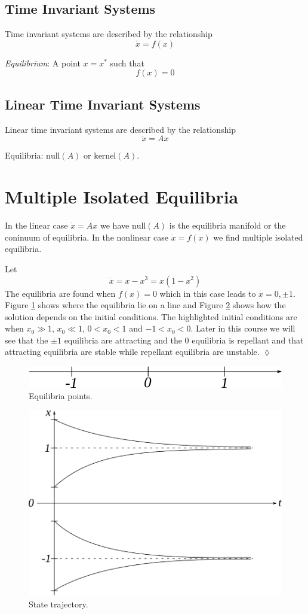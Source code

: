 \subsection{Time Invariant Systems}
Time invariant systems are described by the relationship
$$\dot{x}=f(x)$$
\begin{definition}
\textit{Equilibrium}: A point $x=x^\ast$ such that
$$f(x) = 0$$
\end{definition}

\subsection{Linear Time Invariant Systems}
Linear time invariant systems are described by the relationship
$$\dot{x}=Ax$$
\begin{definition}
Equilibria: $\text{null}(A)$ or $\text{kernel}(A)$.
\end{definition}

\section{Multiple Isolated Equilibria}
In the linear case $\dot{x}=Ax$ we have $\text{null}(A)$ is the equilibria manifold or the coninuum of equilibria. In the nonlinear case $\dot{x}=f(x)$ we find multiple isolated equilibria.
\begin{example}
Let
$$\dot{x} = x-x^3 = x(1-x^2)$$
The equilibria are found when $f(x)=0$ which in this case leads to $x=0,\pm1$. Figure \ref{fig:01roots} shows where the equilibria lie on a line and Figure \ref{fig:01traj} shows how the solution depends on the initial conditions. The highlighted initial conditions are when $x_0\gg1$, $x_0\ll1$, $0<x_0<1$ and $-1<x_0<0$. Later in this course we will see that the $\pm1$ equilibria are attracting and the $0$ equilibria is repellant and that attracting equilibria are stable while repellant equilibria are unstable.
$\lozenge$
\end{example}

\begin{figure}[ht!]
	\centering
	\includegraphics[width=.4\textwidth]{images/01roots}
	\caption{Equilibria points.}
	\label{fig:01roots}
\end{figure}

\begin{figure}[ht!]
	\centering
	\includegraphics[width=.4\textwidth]{images/01traj}
	\caption{State trajectory.}
	\label{fig:01traj}
\end{figure}

